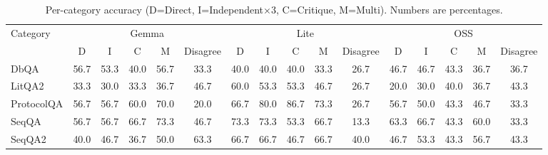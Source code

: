\begin{table}[h]
\centering
\small
\begin{tabular}{lccccccccccccccc}
\toprule
Category & \multicolumn{5}{c}{Gemma} & \multicolumn{5}{c}{Lite} & \multicolumn{5}{c}{OSS} \\
 & D & I & C & M & Disagree & D & I & C & M & Disagree & D & I & C & M & Disagree \\
\midrule
DbQA & 56.7 & 53.3 & 40.0 & 56.7 & 33.3 & 40.0 & 40.0 & 40.0 & 33.3 & 26.7 & 46.7 & 46.7 & 43.3 & 36.7 & 36.7 \\
LitQA2 & 33.3 & 30.0 & 33.3 & 36.7 & 46.7 & 60.0 & 53.3 & 53.3 & 46.7 & 26.7 & 20.0 & 30.0 & 40.0 & 36.7 & 43.3 \\
ProtocolQA & 56.7 & 56.7 & 60.0 & 70.0 & 20.0 & 66.7 & 80.0 & 86.7 & 73.3 & 26.7 & 56.7 & 50.0 & 43.3 & 46.7 & 33.3 \\
SeqQA & 56.7 & 56.7 & 66.7 & 73.3 & 46.7 & 73.3 & 73.3 & 53.3 & 66.7 & 13.3 & 63.3 & 66.7 & 43.3 & 60.0 & 33.3 \\
SeqQA2 & 40.0 & 46.7 & 36.7 & 50.0 & 63.3 & 66.7 & 66.7 & 46.7 & 66.7 & 40.0 & 46.7 & 53.3 & 43.3 & 56.7 & 43.3 \\
\bottomrule
\end{tabular}
\caption{Per-category accuracy (D=Direct, I=Independent×3, C=Critique, M=Multi). Numbers are percentages.}
\label{tab:by-category}
\end{table}
